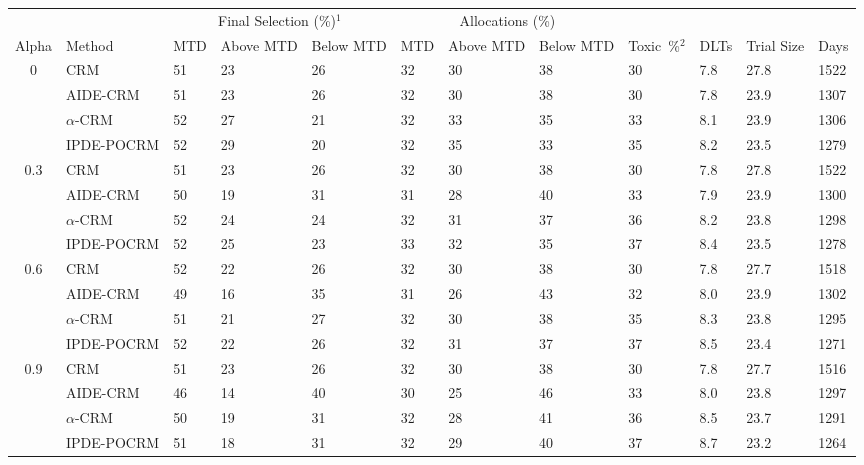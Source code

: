 \begin{tabular*}{\textwidth}{@{\extracolsep\fill}clllllllllll@{\extracolsep\fill}}
\toprule
&  & \multicolumn{3}{c}{Final Selection (\%)$^1$} & \multicolumn{3}{c}{Allocations (\%)} & &  &  &  \\
\multirow{2}{2em}{Alpha} & \multirow{2}{2em}{Method} & \multirow{2}{2em}{MTD} & \multirow{2}{2em}{Above MTD} & \multirow{2}{2em}{Below MTD} & \multirow{2}{2em}{MTD} & \multirow{2}{2em}{Above MTD} & \multirow{2}{2em}{Below MTD} & \multirow{2}{2em}{Toxic~\%$^2$} & \multirow{2}{2em}{DLTs} & \multirow{2}{2em}{Trial Size} & \multirow{2}{2em}{Days}  \\ \\ 
\midrule
\multirow{4}{2em}{0} & CRM & 51 & 23 & 26 & 32 & 30 & 38 & 30 & 7.8 & 27.8 & 1522\\
 & AIDE-CRM & 51 & 23 & 26 & 32 & 30 & 38 & 30 & 7.8 & 23.9 & 1307\\
 & $\alpha$-CRM & 52 & 27 & 21 & 32 & 33 & 35 & 33 & 8.1 & 23.9 & 1306\\
 & IPDE-POCRM & 52 & 29 & 20 & 32 & 35 & 33 & 35 & 8.2 & 23.5 & 1279\\
\midrule
\multirow{4}{2em}{0.3} & CRM & 51 & 23 & 26 & 32 & 30 & 38 & 30 & 7.8 & 27.8 & 1522\\
 & AIDE-CRM & 50 & 19 & 31 & 31 & 28 & 40 & 33 & 7.9 & 23.9 & 1300\\
 & $\alpha$-CRM & 52 & 24 & 24 & 32 & 31 & 37 & 36 & 8.2 & 23.8 & 1298\\
 & IPDE-POCRM & 52 & 25 & 23 & 33 & 32 & 35 & 37 & 8.4 & 23.5 & 1278\\
\midrule
\multirow{4}{2em}{0.6} & CRM & 52 & 22 & 26 & 32 & 30 & 38 & 30 & 7.8 & 27.7 & 1518\\
 & AIDE-CRM & 49 & 16 & 35 & 31 & 26 & 43 & 32 & 8.0 & 23.9 & 1302\\
 & $\alpha$-CRM & 51 & 21 & 27 & 32 & 30 & 38 & 35 & 8.3 & 23.8 & 1295\\
 & IPDE-POCRM & 52 & 22 & 26 & 32 & 31 & 37 & 37 & 8.5 & 23.4 & 1271\\
\midrule
\multirow{4}{2em}{0.9} & CRM & 51 & 23 & 26 & 32 & 30 & 38 & 30 & 7.8 & 27.7 & 1516\\
 & AIDE-CRM & 46 & 14 & 40 & 30 & 25 & 46 & 33 & 8.0 & 23.8 & 1297\\
 & $\alpha$-CRM & 50 & 19 & 31 & 32 & 28 & 41 & 36 & 8.5 & 23.7 & 1291\\
 & IPDE-POCRM & 51 & 18 & 31 & 32 & 29 & 40 & 37 & 8.7 & 23.2 & 1264\\
\bottomrule
\end{tabular*}
